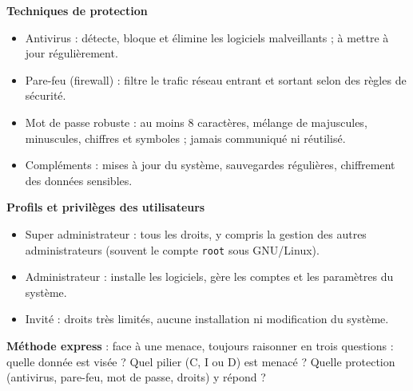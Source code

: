 \documentclass[11pt]{article}
\newcommand{\cle}[1]{{\popxbold\color{popdark}#1}}
\begin{document}
\begin{bilan}
\textbf{Techniques de protection}
\begin{itemize}
  \item \cle{Antivirus} : détecte, bloque et élimine les logiciels malveillants ; à mettre à jour régulièrement.
  \item \cle{Pare-feu} (firewall) : filtre le trafic réseau entrant et sortant selon des règles de sécurité.
  \item \cle{Mot de passe} robuste : au moins 8 caractères, mélange de majuscules, minuscules, chiffres et symboles ; jamais communiqué ni réutilisé.
  \item Compléments : mises à jour du système, sauvegardes régulières, chiffrement des données sensibles.
\end{itemize}

\textbf{Profils et privilèges des utilisateurs}
\begin{itemize}
  \item \cle{Super administrateur} : tous les droits, y compris la gestion des autres administrateurs (souvent le compte \texttt{root} sous GNU/Linux).
  \item \cle{Administrateur} : installe les logiciels, gère les comptes et les paramètres du système.
  \item \cle{Invité} : droits très limités, aucune installation ni modification du système.
\end{itemize}

\textbf{Méthode express} : face à une menace, toujours raisonner en trois questions : quelle donnée est visée ? Quel pilier (C, I ou D) est menacé ? Quelle protection (antivirus, pare-feu, mot de passe, droits) y répond ?
\end{bilan}
\end{document}
